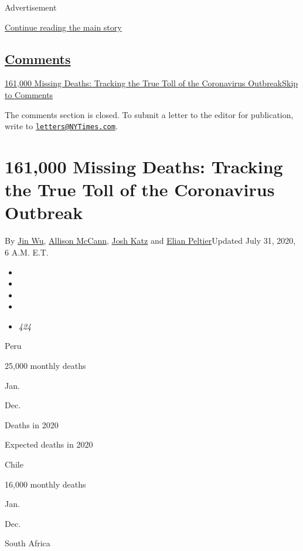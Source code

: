 Advertisement

\protect\hyperlink{after-top}{Continue reading the main story}

\hypertarget{comments}{%
\subsection{\texorpdfstring{\protect\hyperlink{commentsContainer}{Comments}}{Comments}}\label{comments}}

\href{}{161,000 Missing Deaths: Tracking the True Toll of the
Coronavirus Outbreak}\href{}{Skip to Comments}

The comments section is closed. To submit a letter to the editor for
publication, write to
\href{mailto:letters@NYTimes.com}{\nolinkurl{letters@NYTimes.com}}.

\hypertarget{161000-missing-deaths-tracking-the-true-toll-of-the-coronavirus-outbreak}{%
\section{161,000 Missing Deaths: Tracking the True Toll of the
Coronavirus
Outbreak}\label{161000-missing-deaths-tracking-the-true-toll-of-the-coronavirus-outbreak}}

By \href{https://www.nytimes3xbfgragh.onion/by/jin-wu}{Jin Wu},
\href{https://www.nytimes3xbfgragh.onion/by/allison-mccann}{Allison
McCann}, \href{https://www.nytimes3xbfgragh.onion/by/josh-katz}{Josh
Katz} and
\href{https://www.nytimes3xbfgragh.onion/by/elian-peltier}{Elian
Peltier}Updated July 31, 2020, 6 A.M. E.T.

\begin{itemize}
\item
\item
\item
\item
\item
  \emph{424}
\end{itemize}

Peru

25,000 monthly deaths

Jan.

Dec.

Deaths in 2020

Expected deaths in 2020

Chile

16,000 monthly deaths

Jan.

Dec.

South Africa

